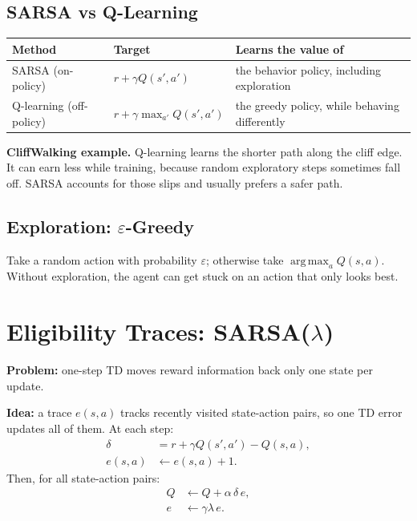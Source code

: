 \documentclass[11pt]{article}
\DeclareMathOperator*{\argmax}{arg\,max}
\begin{document}
\subsection{SARSA vs Q-Learning}

\begin{center}
\begin{tabular}{lll}
  \toprule
  \textbf{Method} & \textbf{Target} & \textbf{Learns the value of} \\
  \midrule
  SARSA (on-policy) & $r + \gamma Q(s',a')$ & the behavior policy, including exploration \\
  Q-learning (off-policy) & $r + \gamma \max_{a'} Q(s',a')$ & the greedy policy, while behaving differently \\
  \bottomrule
\end{tabular}
\end{center}

\textbf{CliffWalking example.} Q-learning learns the shorter path along the cliff edge.
It can earn less while training, because random exploratory steps sometimes fall off.
SARSA accounts for those slips and usually prefers a safer path.

\subsection{Exploration: $\varepsilon$-Greedy}

Take a random action with probability $\varepsilon$; otherwise take
$\argmax_a Q(s,a)$. Without exploration, the agent can get stuck on an action that
only looks best.

\section{Eligibility Traces: SARSA($\lambda$)}

\textbf{Problem:} one-step TD moves reward information back only one state per update.

\textbf{Idea:} a trace $e(s,a)$ tracks recently visited state-action pairs, so one TD
error updates all of them. At each step:
\begin{align*}
  \delta &= r + \gamma Q(s',a') - Q(s,a), \\
  e(s,a) &\leftarrow e(s,a) + 1.
\end{align*}
Then, for all state-action pairs:
\begin{align*}
  Q &\leftarrow Q + \alpha\, \delta\, e, \\
  e &\leftarrow \gamma \lambda\, e.
\end{align*}
\end{document}
